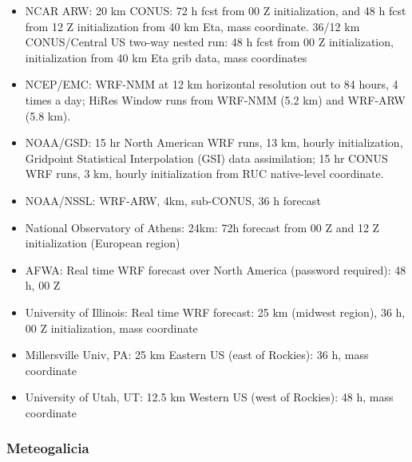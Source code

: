 \documentclass[11pt]{article}
\begin{document}
\begin{itemize}
\item NCAR ARW: 20 km CONUS: 72 h fcst from 00 Z initialization, and 48 h
fcst from 12 Z initialization from 40 km Eta, mass coordinate. 36/12
km CONUS/Central US two-way nested run: 48 h fcst from 00 Z
initialization, initialization from 40 km Eta grib data, mass
coordinates

\item NCEP/EMC: WRF-NMM at 12 km horizontal resolution out to 84
hours, 4 times a day; HiRes Window runs from WRF-NMM (5.2 km) and WRF-ARW (5.8 km).

\item NOAA/GSD: 15 hr North American WRF runs, 13 km, hourly
initialization, Gridpoint Statistical Interpolation (GSI) data
assimilation; 15 hr CONUS WRF runs, 3 km, hourly initialization from RUC native-level coordinate.

\item NOAA/NSSL: WRF-ARW, 4km, sub-CONUS, 36 h forecast

\item National Observatory of Athens: 24km: 72h forecast from 00 Z and 12 Z initialization (European region)

\item AFWA: Real time WRF forecast over North America (password required): 48 h, 00 Z

\item University of Illinois: Real time WRF forecast: 25 km (midwest region), 36 h, 00 Z initialization, mass coordinate

\item Millersville Univ, PA: 25 km Eastern US (east of Rockies): 36 h, mass coordinate

\item University of Utah, UT: 12.5 km Western US (west of Rockies): 48 h, mass coordinate
\end{itemize}

\subsubsection{Meteogalicia}
\label{sec-2-2-3}
\end{document}
